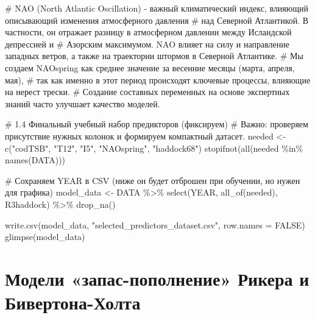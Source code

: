 \documentclass[
  letterpaper,
  DIV=11,
  numbers=noendperiod]{scrreprt}
\newenvironment{Shaded}{\begin{snugshade}}{\end{snugshade}}
\newcommand{\AttributeTok}[1]{\textcolor[rgb]{0.40,0.45,0.13}{#1}}
\newcommand{\CommentTok}[1]{\textcolor[rgb]{0.37,0.37,0.37}{#1}}
\newcommand{\ConstantTok}[1]{\textcolor[rgb]{0.56,0.35,0.01}{#1}}
\newcommand{\FunctionTok}[1]{\textcolor[rgb]{0.28,0.35,0.67}{#1}}
\newcommand{\NormalTok}[1]{\textcolor[rgb]{0.00,0.23,0.31}{#1}}
\newcommand{\OtherTok}[1]{\textcolor[rgb]{0.00,0.23,0.31}{#1}}
\newcommand{\SpecialCharTok}[1]{\textcolor[rgb]{0.37,0.37,0.37}{#1}}
\newcommand{\StringTok}[1]{\textcolor[rgb]{0.13,0.47,0.30}{#1}}
\begin{document}
\begin{Shaded}
\begin{Highlighting}[]
\CommentTok{\# NAO (North Atlantic Oscillation) {-} важный климатический индекс, влияющий описывающий изменения атмосферного давления}
\CommentTok{\# над Северной Атлантикой. В частности, он отражает разницу в атмосферном давлении между Исландской депрессией и}
\CommentTok{\# Азорским максимумом. NAO влияет на силу и направление западных ветров, а также на траектории штормов в Северной Атлантике. }
\CommentTok{\# Мы создаем NAOspring как среднее значение за весенние месяцы (марта, апреля, мая),}
\CommentTok{\# так как именно в этот период происходят ключевые процессы, влияющие на нерест трески. }
\CommentTok{\# Создание составных переменных на основе экспертных знаний часто улучшает качество моделей.}

\CommentTok{\# 1.4 Финальный учебный набор предикторов (фиксируем)}
\CommentTok{\# Важно: проверяем присутствие нужных колонок и формируем компактный датасет.}
\NormalTok{needed }\OtherTok{\textless{}{-}} \FunctionTok{c}\NormalTok{(}\StringTok{"codTSB"}\NormalTok{, }\StringTok{"T12"}\NormalTok{, }\StringTok{"I5"}\NormalTok{, }\StringTok{"NAOspring"}\NormalTok{, }\StringTok{"haddock68"}\NormalTok{)}
\FunctionTok{stopifnot}\NormalTok{(}\FunctionTok{all}\NormalTok{(needed }\SpecialCharTok{\%in\%} \FunctionTok{names}\NormalTok{(DATA)))}

\CommentTok{\# Сохраняем YEAR в CSV (ниже он будет отброшен при обучении, но нужен для графика)}
\NormalTok{model\_data }\OtherTok{\textless{}{-}}\NormalTok{ DATA }\SpecialCharTok{\%\textgreater{}\%}
  \FunctionTok{select}\NormalTok{(YEAR, }\FunctionTok{all\_of}\NormalTok{(needed), R3haddock) }\SpecialCharTok{\%\textgreater{}\%}
  \FunctionTok{drop\_na}\NormalTok{()}

\FunctionTok{write.csv}\NormalTok{(model\_data, }\StringTok{"selected\_predictors\_dataset.csv"}\NormalTok{, }\AttributeTok{row.names =} \ConstantTok{FALSE}\NormalTok{)}
\FunctionTok{glimpse}\NormalTok{(model\_data)}
\end{Highlighting}
\end{Shaded}

\section{Модели «запас-пополнение» Рикера и
Бивертона-Холта}\label{ux43cux43eux434ux435ux43bux438-ux437ux430ux43fux430ux441-ux43fux43eux43fux43eux43bux43dux435ux43dux438ux435-ux440ux438ux43aux435ux440ux430-ux438-ux431ux438ux432ux435ux440ux442ux43eux43dux430-ux445ux43eux43bux442ux430}
\end{document}
